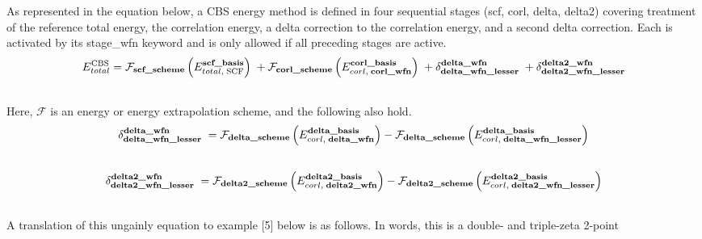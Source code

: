 \documentclass[letterpaper,10pt,english]{sphinxmanual}
\begin{document}
\begin{fulllineitems}
As represented in the equation below, a CBS energy method is defined in four 
sequential stages (scf, corl, delta, delta2) covering treatment of the 
reference total energy, the correlation energy, a delta correction to the
correlation energy, and a second delta correction. Each is activated by its 
stage\_wfn keyword and is only allowed if all preceding stages are active.
\begin{gather}
\begin{split}E_{total}^{\text{CBS}} = \mathcal{F}_{\textbf{scf\_scheme}} \left(E_{total,\; \text{SCF}}^{\textbf{scf\_basis}}\right) \; + \mathcal{F}_{\textbf{corl\_scheme}} \left(E_{corl,\; \textbf{corl\_wfn}}^{\textbf{corl\_basis}}\right) \; + \delta_{\textbf{delta\_wfn\_lesser}}^{\textbf{delta\_wfn}} \; + \delta_{\textbf{delta2\_wfn\_lesser}}^{\textbf{delta2\_wfn}}\end{split}\notag\\\begin{split}\end{split}\notag
\end{gather}
Here, $\mathcal{F}$ is an energy or energy extrapolation scheme, and the following also hold.
\begin{gather}
\begin{split}\delta_{\textbf{delta\_wfn\_lesser}}^{\textbf{delta\_wfn}} \; = \mathcal{F}_{\textbf{delta\_scheme}} \left(E_{corl,\; \textbf{delta\_wfn}}^{\textbf{delta\_basis}}\right) - \mathcal{F}_{\textbf{delta\_scheme}} \left(E_{corl,\; \textbf{delta\_wfn\_lesser}}^{\textbf{delta\_basis}}\right)\end{split}\notag\\\begin{split}\end{split}\notag
\end{gather}\begin{gather}
\begin{split}\delta_{\textbf{delta2\_wfn\_lesser}}^{\textbf{delta2\_wfn}} \; = \mathcal{F}_{\textbf{delta2\_scheme}} \left(E_{corl,\; \textbf{delta2\_wfn}}^{\textbf{delta2\_basis}}\right) - \mathcal{F}_{\textbf{delta2\_scheme}} \left(E_{corl,\; \textbf{delta2\_wfn\_lesser}}^{\textbf{delta2\_basis}}\right)\end{split}\notag\\\begin{split}\end{split}\notag
\end{gather}
A translation of this ungainly equation to example {[}5{]} below is as
follows. In words, this is a double- and triple-zeta 2-point

\end{fulllineitems}
\end{document}
